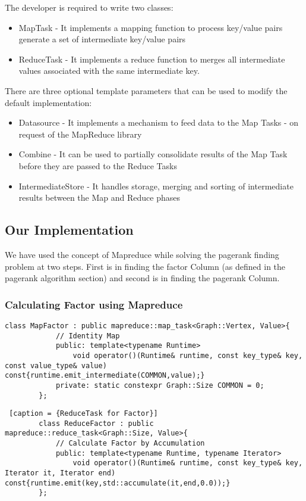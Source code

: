 \documentclass{article}
\begin{document}
    The developer is required to write two classes:
    \begin{itemize}
        \item MapTask - It implements a mapping function to process key/value pairs generate a set of intermediate key/value pairs 
        \item ReduceTask - It implements a reduce function to merges all intermediate values associated with the same intermediate key. 
    \end{itemize}
    There are three optional template parameters that can be used to modify the default implementation:
    \begin{itemize}
        \item Datasource - It implements a mechanism to feed data to the Map Tasks - on request of the MapReduce library
        \item Combine - It can be used to partially consolidate results of the Map Task before they are passed to the Reduce Tasks
        \item IntermediateStore - It handles storage, merging and sorting of intermediate results between the Map and Reduce phases
    \end{itemize}{}
    
    \subsection{Our Implementation}
    We have used the concept of Mapreduce while solving the pagerank finding problem at two steps. First is in finding the factor Column (as defined in the pagerank algorithm section) and second is in finding the pagerank Column.
    \subsubsection{Calculating Factor using Mapreduce}
    \begin{lstlisting}[caption={ MapTask for Factor}] 
        class MapFactor : public mapreduce::map_task<Graph::Vertex, Value>{
            // Identity Map
            public: template<typename Runtime>
                void operator()(Runtime& runtime, const key_type& key, const value_type& value) const{runtime.emit_intermediate(COMMON,value);}
            private: static constexpr Graph::Size COMMON = 0;              
        };
    \end{lstlisting}
    
    \begin{lstlisting} [caption = {ReduceTask for Factor}]
        class ReduceFactor : public mapreduce::reduce_task<Graph::Size, Value>{
            // Calculate Factor by Accumulation
            public: template<typename Runtime, typename Iterator>
                void operator()(Runtime& runtime, const key_type& key, Iterator it, Iterator end) const{runtime.emit(key,std::accumulate(it,end,0.0));}
        };
    \end{lstlisting}
    
\end{document}
